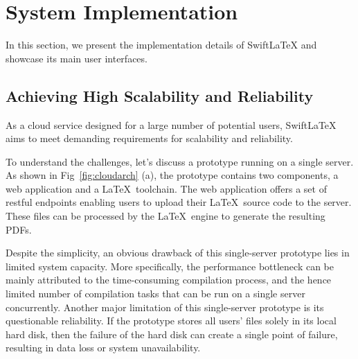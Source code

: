 \documentclass[sigconf]{acmart}
\begin{document}










\section{System Implementation}\label{sect:imp}
In this section, we present the implementation details of SwiftLaTeX and showcase its main user interfaces.

\subsection{Achieving High Scalability and Reliability}
As a cloud service designed for a large number of potential users, SwiftLaTeX aims to meet demanding requirements for scalability and reliability.




To understand the challenges, let's discuss a prototype running on a single server.
 As shown in Fig~\ref{fig:cloudarch} (a), the prototype contains two components, a web application and a \LaTeX\ toolchain. The web application offers a set of restful endpoints enabling users to upload their \LaTeX\ source code to the server. 
 These files can be processed by the \LaTeX\ engine to generate the resulting PDFs. 

Despite the simplicity, an obvious drawback of this single-server prototype lies in limited system capacity. More specifically, the performance bottleneck can be mainly attributed to the time-consuming compilation process, and the hence limited number of compilation tasks that can be run on a single server concurrently.
  Another major limitation of  this single-server prototype is its questionable reliability. If the prototype  stores all users' files solely in its local hard disk, then the failure of the hard disk can create a single point of failure, resulting in data loss or system unavailability. 
\end{document}
